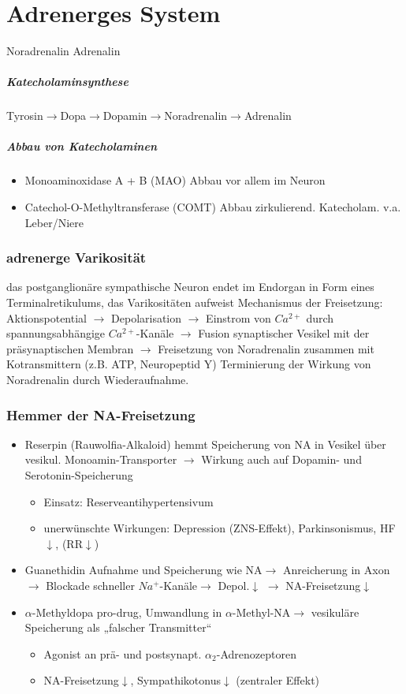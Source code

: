 \documentclass[10pt,a4paper]{report}
\begin{document}
\chapter{Adrenerges System}
Noradrenalin Adrenalin
\paragraph{Katecholaminsynthese} Tyrosin$\rightarrow$Dopa$\rightarrow$Dopamin$\rightarrow$Noradrenalin$\rightarrow$Adrenalin
\paragraph{Abbau von Katecholaminen}
\begin{itemize}
	\item Monoaminoxidase A + B (MAO) Abbau vor allem im Neuron
	\item Catechol-O-Methyltransferase (COMT) Abbau zirkulierend. Katecholam. v.a. Leber/Niere
\end{itemize}
\subsection{adrenerge Varikosität}
das postganglionäre sympathische Neuron endet im Endorgan in Form eines Terminalretikulums, das Varikositäten aufweist Mechanismus der Freisetzung: Aktionspotential $\rightarrow$ Depolarisation $\rightarrow$ Einstrom von $Ca^{2+}$ durch spannungsabhängige $Ca^{2+}$-Kanäle $\rightarrow$ Fusion synaptischer Vesikel mit der präsynaptischen Membran $\rightarrow$ Freisetzung von Noradrenalin zusammen mit Kotransmittern (z.B. ATP, Neuropeptid Y) Terminierung der Wirkung von Noradrenalin durch Wiederaufnahme.
\subsection{Hemmer der NA-Freisetzung}
\begin{itemize}
	\item Reserpin (Rauwolfia-Alkaloid) hemmt Speicherung von NA in Vesikel über vesikul. Monoamin-Transporter $\rightarrow$ Wirkung auch auf Dopamin- und Serotonin-Speicherung
	\begin{itemize}
		\item Einsatz: Reserveantihypertensivum
		\item unerwünschte Wirkungen: Depression (ZNS-Effekt), Parkinsonismus, HF$\downarrow$, (RR$\downarrow$)
	\end{itemize}		
	\item Guanethidin Aufnahme und Speicherung wie NA$\rightarrow$ Anreicherung in Axon$\rightarrow$ Blockade schneller $Na^+$-Kanäle$\rightarrow$ Depol.$\downarrow$ $\rightarrow$ NA-Freisetzung$\downarrow$
	\item $\alpha$-Methyldopa pro-drug, Umwandlung in $\alpha$-Methyl-NA$\rightarrow$ vesikuläre Speicherung als „falscher Transmitter“ 
	\begin{itemize}
		\item Agonist an prä- und postsynapt. $\alpha_2$-Adrenozeptoren 
		\item NA-Freisetzung$\downarrow$, Sympathikotonus$\downarrow$ (zentraler Effekt)
	\end{itemize}
\end{itemize}
\end{document}
